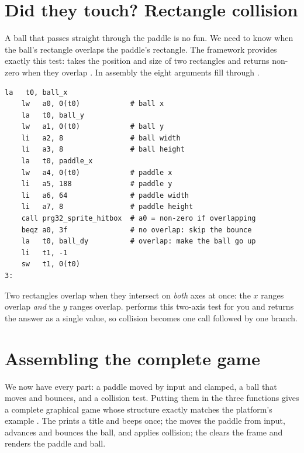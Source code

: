 \section{Did they touch? Rectangle collision}

A ball that passes straight through the paddle is no fun. We need to know when
the ball's rectangle overlaps the paddle's rectangle. The framework provides
exactly this test: 
takes the position and size of two rectangles and returns non-zero when they
overlap \citep{prg32tutorialgraphic}. In assembly the eight arguments fill
 through .

\begin{lstlisting}[style=asm,caption={Testing ball-versus-paddle overlap. A non-zero result in \reg{a0} means they touched this frame.}]
    la   t0, ball_x
    lw   a0, 0(t0)            # ball x
    la   t0, ball_y
    lw   a1, 0(t0)            # ball y
    li   a2, 8                # ball width
    li   a3, 8                # ball height
    la   t0, paddle_x
    lw   a4, 0(t0)            # paddle x
    li   a5, 188              # paddle y
    li   a6, 64               # paddle width
    li   a7, 8                # paddle height
    call prg32_sprite_hitbox  # a0 = non-zero if overlapping
    beqz a0, 3f               # no overlap: skip the bounce
    la   t0, ball_dy          # overlap: make the ball go up
    li   t1, -1
    sw   t1, 0(t0)
3:
\end{lstlisting}

\begin{prgconcept}
Two rectangles overlap when they intersect on \emph{both} axes at once: the $x$
ranges overlap \emph{and} the $y$ ranges overlap. 
performs this two-axis test for you and returns the answer as a single value, so
collision becomes one call followed by one branch.
\end{prgconcept}

\section{Assembling the complete game}

We now have every part: a paddle moved by input and clamped, a ball that moves
and bounces, and a collision test. Putting them in the three functions gives a
complete graphical game whose structure exactly matches the platform's
 example \citep{prg32repo}. The  prints a title
and beeps once; the  moves the paddle from input, advances and
bounces the ball, and applies collision; the  clears the frame and
renders the paddle and ball.

